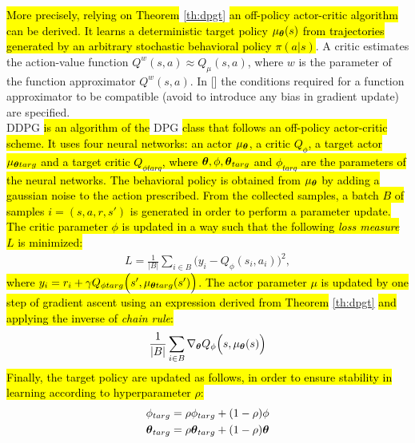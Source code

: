 \newline
\hl{More precisely, relying on Theorem} \ref{th:dpgt} \hl{an off-policy actor-critic algorithm can be derived. It learns a deterministic target policy $\mu_{\boldsymbol{\theta}}(s)$ from trajectories generated by an arbitrary stochastic behavioral policy $\pi(a|s)$}. A critic estimates the action-value function $Q^w(s,a) \approx Q_{\mu}(s,a)$, where $w$ is the parameter of the function approximator $Q^w(s,a)$. In [\cite{article}] the conditions required for a function approximator to be compatible (\ie avoid to introduce any bias in gradient update) are specified.\\
\newline
\acf{DDPG} \hl{is an algorithm of the} \ac{DPG} \hl{class that follows an off-policy actor-critic scheme. It uses four neural networks: an actor $\mu_{\boldsymbol{\theta}}$, a critic $Q_{\phi}$, a target actor $\mu_{\boldsymbol{\theta} targ}$ and a target critic $Q_{\phi targ}$, where $\boldsymbol{\theta}, \phi, \boldsymbol{\theta}_{targ}$ and $\phi_{targ}$ are the parameters of the neural networks. The behavioral policy is obtained from $\mu_{\boldsymbol{\theta}}$ by adding a gaussian noise to the action prescribed. From the collected samples, a batch $B$ of samples $i = (s,a,r,s')$ is generated in order to perform a parameter update.}\\
\newline
\hl{The critic parameter $\phi$ is updated in a way such that the following \emph{loss measure} $L$ is minimized:}
\begin{align}
	L = \frac{1}{|B|} \sum_{i \in B}\Big(y_i - Q_{\phi}(s_i, a_i) \Big)^2,
\end{align}
\hl{where $y_i = r_i + \gamma Q_{\phi targ}\Big(s', \mu_{\boldsymbol{\theta} targ}(s')\Big)$. The actor parameter $\mu$ is updated by one step of gradient ascent using an expression derived from Theorem} \ref{th:dpgt} \hl{and applying the inverse of \emph{chain rule}:}
\begin{align}
	\frac{1}{|B|}\sum_{i \in B}\nabla_{\boldsymbol{\theta}}Q_{\phi}\Big(s, \mu_{\boldsymbol{\theta}}(s)\Big)
\end{align}
\hl{Finally, the target policy are updated as follows, in order to ensure stability in learning according to hyperparameter $\rho$:}
\begin{align}
	\phi_{targ} &= \rho \phi_{targ} + (1 - \rho) \phi\\
	\boldsymbol{\theta}_{targ} &= \rho \boldsymbol{\theta}_{targ} + (1 - \rho) \boldsymbol{\theta}
\end{align}

